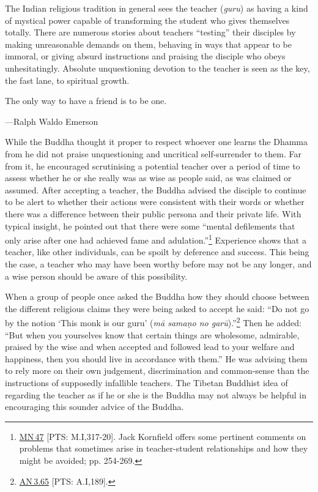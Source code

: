 \documentclass[10pt, openright]{book}
\newenvironment{epigram-2}%
{%
\setstretch{1.4}
\vspace{1em}
\noindent
\quoting[leftmargin=2cm,rightmargin=2cm]%
\begin{itshape}
\large
}%
{\end{itshape}\endquoting
}%
\newenvironment{epigram-2-cite}%
{%
\quoting[leftmargin=2cm,rightmargin=2cm]%
\noindent\normal\hspace*{\fill} 
}%
{\endquoting
}%
\begin{document}
The Indian religious tradition in general sees the teacher (\textit{guru}) as having a kind of mystical power capable of transforming the student who gives themselves totally. There are numerous stories about teachers “testing” their disciples by making unreasonable demands on them, behaving in ways that appear to be immoral, or giving absurd instructions and praising the disciple who obeys unhesitatingly. Absolute unquestioning devotion to the teacher is seen as the key, the fast lane, to spiritual growth.


\begin{epigram-2}
The only way to have a friend is to be one.
\end{epigram-2}
\begin{epigram-2-cite}
—Ralph Waldo Emerson
\end{epigram-2-cite}

While the Buddha thought it proper to respect whoever one learns the Dhamma from he did not praise unquestioning and uncritical self-surrender to them. Far from it, he encouraged scrutinising a potential teacher over a period of time to assess whether he or she really was as wise as people said, as was claimed or assumed. After accepting a teacher, the Buddha advised the disciple to continue to be alert to whether their actions were consistent with their words or whether there was a difference between their public persona and their private life. With typical insight, he pointed out that there were some “mental defilements that only arise after one had achieved fame and adulation.”\footnote {\href{https://suttacentral.net/mn47/en/sujato}{MN 47} [PTS: M.I,317-20]. Jack Kornfield offers some pertinent comments on problems that sometimes arise in teacher-student relationships and how they might be avoided; \cite{Kornfield 1993} pp. 254-269.} Experience shows that a teacher, like other individuals, can be spoilt by deference and success. This being the case, a teacher who may have been worthy before may not be any longer, and a wise person should be aware of this possibility.


When a group of people once asked the Buddha how they should choose between the different religious claims they were being asked to accept he said: “Do not go by the notion ‘This monk is our guru’ (\textit{mā samaṇo no garū}).”\footnote {\href{https://suttacentral.net/an3.65/en/sujato}{AN 3.65} [PTS: A.I,189].} Then he added: “But when you yourselves know that certain things are wholesome, admirable, praised by the wise and when accepted and followed lead to your welfare and happiness, then you should live in accordance with them.” He was advising them to rely more on their own judgement, discrimination and common-sense than the instructions of supposedly infallible teachers. The Tibetan Buddhist idea of regarding the teacher as if he or she is the Buddha may not always be helpful in encouraging this sounder advice of the Buddha.
\end{document}
